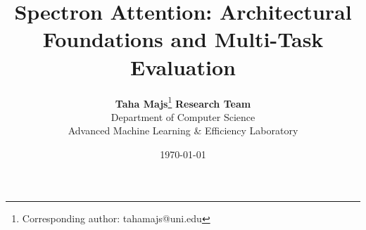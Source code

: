\title{\textbf{Spectron Attention: Architectural Foundations and Multi-Task Evaluation}}

\author{
  \textbf{Taha Majs}\thanks{Corresponding author: tahamajs@uni.edu} \quad \textbf{Research Team} \\
  Department of Computer Science \\
  Advanced Machine Learning \& Efficiency Laboratory
}

\date{\today}
